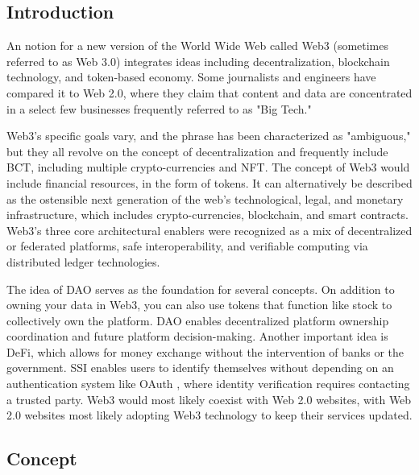 \subsection{Introduction}
An notion for a new version of the World Wide Web called Web3 (sometimes referred to as Web 3.0) integrates ideas including decentralization, blockchain technology, and token-based economy. Some journalists and engineers have compared it to Web 2.0, where they claim that content and data are concentrated in a select few businesses frequently referred to as "Big Tech."

\vspace{.5cm}

Web3's specific goals vary, and the phrase has been characterized as "ambiguous," but they all revolve on the concept of decentralization and frequently include \ac{BCT}, including multiple crypto-currencies and \ac{NFT}. The concept of Web3 would include financial resources, in the form of tokens. It can alternatively be described as the ostensible next generation of the web's technological, legal, and monetary infrastructure, which includes crypto-currencies, blockchain, and smart contracts. Web3's three core architectural enablers were recognized as a mix of decentralized or federated platforms, safe interoperability, and verifiable computing via distributed ledger technologies.

\vspace{.5cm}

The idea of \ac{DAO} serves as the foundation for several concepts. On addition to owning your data in Web3, you can also use tokens that function like stock to collectively own the platform. \ac{DAO} enables decentralized platform ownership coordination and future platform decision-making. Another important idea is \ac{DeFi}, which allows for money exchange without the intervention of banks or the government. \ac{SSI} enables users to identify themselves without depending on an authentication system like OAuth \cite{oauth}, where identity verification requires contacting a trusted party. Web3 would most likely coexist with Web 2.0 websites, with Web 2.0 websites most likely adopting Web3 technology to keep their services updated.

\subsection{Concept}

